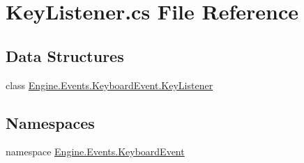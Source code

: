 \hypertarget{a00059}{}\section{Key\+Listener.\+cs File Reference}
\label{a00059}
\subsection*{Data Structures}
\begin{DoxyCompactItemize}
\item 
class \hyperlink{a00370}{Engine.\+Events.\+Keyboard\+Event.\+Key\+Listener}
\end{DoxyCompactItemize}
\subsection*{Namespaces}
\begin{DoxyCompactItemize}
\item 
namespace \hyperlink{a00247}{Engine.\+Events.\+Keyboard\+Event}
\end{DoxyCompactItemize}
